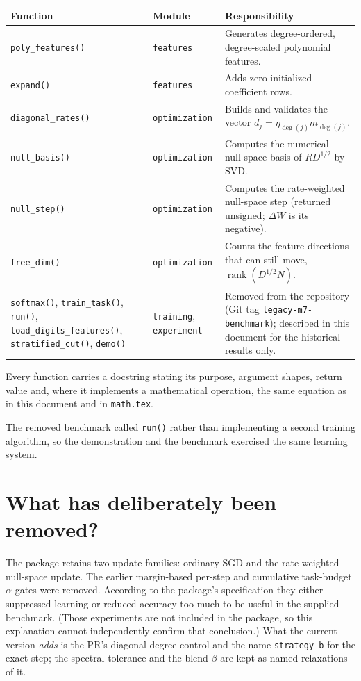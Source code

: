 \documentclass[11pt,a4paper]{article}
\newcommand{\code}[1]{\texttt{#1}}
\begin{document}
\begin{center}
\begin{tabular}{@{}llp{8.2cm}@{}}
\toprule
Function & Module & Responsibility\\
\midrule
\code{poly\_features()} & \code{features} & Generates degree-ordered, degree-scaled polynomial features.\\
\code{expand()} & \code{features} & Adds zero-initialized coefficient rows.\\
\code{diagonal\_rates()} & \code{optimization} & Builds and validates the vector $d_j=\eta_{\deg(j)}m_{\deg(j)}$.\\
\code{null\_basis()} & \code{optimization} & Computes the numerical null-space basis of $RD^{1/2}$ by SVD.\\
\code{null\_step()} & \code{optimization} & Computes the rate-weighted null-space step (returned unsigned; $\Delta W$ is its negative).\\
\code{free\_dim()} & \code{optimization} & Counts the feature directions that can still move, $\operatorname{rank}(D^{1/2}N)$.\\
\code{softmax()}, \code{train\_task()}, \code{run()}, \code{load\_digits\_features()}, \code{stratified\_cut()}, \code{demo()} & \code{training}, \code{experiment} & Removed from the repository (Git tag \code{legacy-m7-benchmark}); described in this document for the historical results only.\\
\bottomrule
\end{tabular}
\end{center}

Every function carries a docstring stating its purpose, argument shapes, return value and, where it implements a mathematical operation, the same equation as in this document and in \code{math.tex}.

The removed benchmark called \code{run()} rather than implementing a second training algorithm, so the demonstration and the benchmark exercised the same learning system.

\section{What has deliberately been removed?}

The package retains two update families: ordinary SGD and the rate-weighted null-space update. The earlier margin-based per-step and cumulative task-budget $\alpha$-gates were removed. According to the package's specification they either suppressed learning or reduced accuracy too much to be useful in the supplied benchmark. (Those experiments are not included in the package, so this explanation cannot independently confirm that conclusion.) What the current version \emph{adds} is the PR's diagonal degree control and the name \code{strategy\_b} for the exact step; the spectral tolerance and the blend $\beta$ are kept as named relaxations of it.
\end{document}
